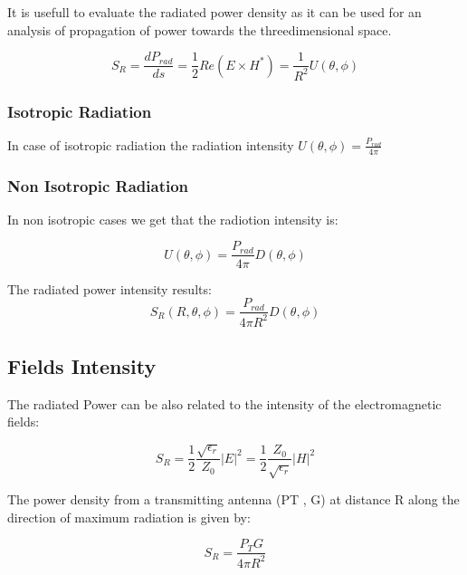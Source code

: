 It is usefull to evaluate the radiated power density as it can be used for an analysis of propagation of power towards the threedimensional space.

\begin{equation}
	S_R=\frac{dP_{rad}}{ds}=\frac{1}{2}Re(E\times H^*)=\frac{1}{R^2}\textit{U}(\theta,\phi)
\end{equation}

\subsubsection*{Isotropic Radiation}

In case of isotropic radiation the radiation intensity $\textit{U}(\theta,\phi)= \frac{P_{rad}}{4\pi}$ 

\subsubsection*{Non Isotropic Radiation}

In non isotropic cases we get that the radiotion intensity is:

\begin{equation}
\textit{U}(\theta,\phi)= \frac{P_{rad}}{4\pi} \textit{D}(\theta, \phi)
\end{equation}


The radiated power intensity results:
\begin{equation}
S_R(R,\theta,\phi)= \frac{P_{rad}}{4\pi R^2} \textit{D}(\theta, \phi)
\end{equation}


\subsection{Fields Intensity} %
\label{sub:fields_intensity}

The radiated Power can be also related to the intensity of the electromagnetic fields:

\begin{equation}
	S_R=\frac{1}{2}\frac{\sqrt{\epsilon_r}}{Z_0}|E|^2= \frac{1}{2}\frac{Z_0}{\sqrt{\epsilon_r}}|H|^2
\end{equation}

The power density from a transmitting antenna (PT , G)
at distance R along the direction of maximum radiation
is given by: 

\begin{equation}	
S_R= \frac{P_TG}{4 \pi R^2}
\end{equation}


